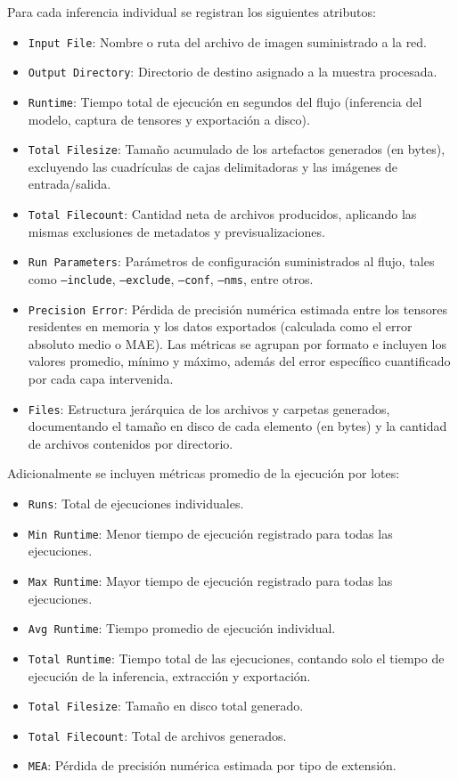 Para cada inferencia individual se registran los siguientes atributos:
\begin{itemize}
    \item \texttt{Input File}: Nombre o ruta del archivo de imagen suministrado a la red.
    \item \texttt{Output Directory}: Directorio de destino asignado a la muestra procesada.
    \item \texttt{Runtime}: Tiempo total de ejecución en segundos del flujo (inferencia del modelo, captura de tensores y exportación a disco).
    \item \texttt{Total Filesize}: Tamaño acumulado de los artefactos generados (en bytes), excluyendo las cuadrículas de cajas 
    delimitadoras y las imágenes de entrada/salida.
    \item \texttt{Total Filecount}: Cantidad neta de archivos producidos, aplicando las mismas exclusiones de metadatos y previsualizaciones.
    \item \texttt{Run Parameters}: Parámetros de configuración suministrados al flujo, tales como \texttt{--include}, \texttt{--exclude}, 
    \texttt{--conf}, \texttt{--nms}, entre otros.
    \item \texttt{Precision Error}: Pérdida de precisión numérica estimada entre los tensores residentes en memoria y los datos exportados 
    (calculada como el error absoluto medio o MAE). Las métricas se agrupan por formato e incluyen los valores promedio, mínimo y máximo, 
    además del error específico cuantificado por cada capa intervenida.
    \item \texttt{Files}: Estructura jerárquica de los archivos y carpetas generados, documentando el tamaño en disco de cada elemento 
    (en bytes) y la cantidad de archivos contenidos por directorio.
\end{itemize}
Adicionalmente se incluyen métricas promedio de la ejecución por lotes:
\begin{itemize}
  \item \texttt{Runs}: Total de ejecuciones individuales.
  \item \texttt{Min Runtime}: Menor tiempo de ejecución registrado para todas las ejecuciones.
  \item \texttt{Max Runtime}: Mayor tiempo de ejecución registrado para todas las ejecuciones.
  \item \texttt{Avg Runtime}: Tiempo promedio de ejecución individual.
  \item \texttt{Total Runtime}: Tiempo total de las ejecuciones, contando solo el tiempo de ejecución de
  la inferencia, extracción y exportación.
  \item \texttt{Total Filesize}: Tamaño en disco total generado.
  \item \texttt{Total Filecount}: Total de archivos generados.
  \item \texttt{MEA}: Pérdida de precisión numérica estimada por tipo de extensión.
\end{itemize}

